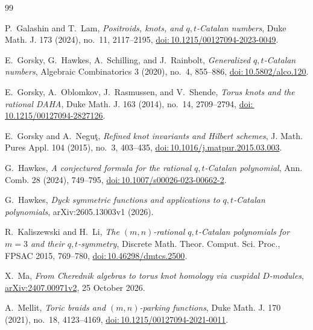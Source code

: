 \documentclass[11pt]{article}
\newcommand{\doi}[1]{\href{https://doi.org/#1}{doi:\,#1}}
\begin{document}
\begin{thebibliography}{99}

P.~Galashin and T.~Lam,
\emph{Positroids, knots, and $q,t$-Catalan numbers},
Duke Math. J. 173 (2024), no.~11, 2117--2195,
\doi{10.1215/00127094-2023-0049}.

E.~Gorsky, G.~Hawkes, A.~Schilling, and J.~Rainbolt,
\emph{Generalized $q,t$-Catalan numbers},
Algebraic Combinatorics 3 (2020), no.~4, 855--886,
\doi{10.5802/alco.120}.

E.~Gorsky, A.~Oblomkov, J.~Rasmussen, and V.~Shende,
\emph{Torus knots and the rational DAHA},
Duke Math. J. 163 (2014), no.~14, 2709--2794,
\doi{10.1215/00127094-2827126}.

E.~Gorsky and A.~Negu\c{t},
\emph{Refined knot invariants and Hilbert schemes},
J. Math. Pures Appl. 104 (2015), no.~3, 403--435,
\doi{10.1016/j.matpur.2015.03.003}.

G.~Hawkes,
\emph{A conjectured formula for the rational $q,t$-Catalan polynomial},
Ann. Comb. 28 (2024), 749--795,
\doi{10.1007/s00026-023-00662-2}.

G.~Hawkes,
\emph{Dyck symmetric functions and applications to $q,t$-Catalan polynomials},
arXiv:2605.13003v1 (2026).

R.~Kaliszewski and H.~Li,
\emph{The $(m,n)$-rational $q,t$-Catalan polynomials for $m=3$ and their
$q,t$-symmetry},
Discrete Math. Theor. Comput. Sci. Proc., FPSAC 2015, 769--780,
\doi{10.46298/dmtcs.2500}.

X.~Ma,
\emph{From Cherednik algebras to torus knot homology via cuspidal
$D$-modules},
\href{https://arxiv.org/abs/2407.00971v2}{arXiv:2407.00971v2},
25 October 2026.

A.~Mellit,
\emph{Toric braids and $(m,n)$-parking functions},
Duke Math. J. 170 (2021), no.~18, 4123--4169,
\doi{10.1215/00127094-2021-0011}.

\end{thebibliography}
\end{document}
